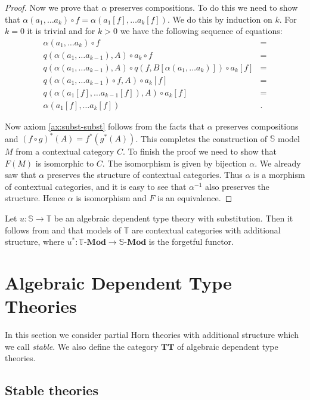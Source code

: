 \documentclass[reqno]{amsart}
\theoremstyle{definition}
\theoremstyle{remark}
\newcommand{\cat}[1]{\mathbf{#1}}
\newcommand{\algtt}{\cat{TT}}
\newcommand{\substTh}{\mathbb{S}}
\newcommand{\Mod}[1]{#1\text{-}\cat{Mod}}
\numberwithin{figure}{section}
\begin{document}
\begin{proof}
Now we prove that $\alpha$ preserves compositions.
To do this we need to show that $\alpha(a_1, \ldots a_k) \circ f = \alpha(a_1[f], \ldots a_k[f])$.
We do this by induction on $k$.
For $k = 0$ it is trivial and for $k > 0$ we have the following sequence of equations:
\begin{align*}
\alpha(a_1, \ldots a_k) \circ f & = \\
q(\alpha(a_1, \ldots a_{k-1}), A) \circ a_k \circ f & = \\
q(\alpha(a_1, \ldots a_{k-1}), A) \circ q(f, B[\alpha(a_1, \ldots a_k)]) \circ a_k[f] & = \\
q(\alpha(a_1, \ldots a_{k-1}) \circ f, A) \circ a_k[f] & = \\
q(\alpha(a_1[f], \ldots a_{k-1}[f]), A) \circ a_k[f] & = \\
\alpha(a_1[f], \ldots a_k[f]) & .
\end{align*}

Now axiom \eqref{ax:subst-subst} follows from the facts that $\alpha$ preserves compositions and $(f \circ g)^*(A) = f^*(g^*(A))$.
This completes the construction of $\substTh$ model $M$ from a contextual category $C$.
To finish the proof we need to show that $F(M)$ is isomorphic to $C$.
The isomorphism is given by bijection $\alpha$.
We already saw that $\alpha$ preserves the structure of contextual categories.
Thus $\alpha$ is a morphism of contextual categories, and it is easy to see that $\alpha^{-1}$ also preserves the structure.
Hence $\alpha$ is isomorphism and $F$ is an equivalence.
\end{proof}

Let $u : \substTh \to \mathbb{T}$ be an algebraic dependent type theory with substitution.
Then it follows from  and  that models of $\mathbb{T}$ are contextual categories with additional structure,
    where $u^* : \Mod{\mathbb{T}} \to \Mod{\substTh}$ is the forgetful functor.

\section{Algebraic Dependent Type Theories}

In this section we consider partial Horn theories with additional structure which we call \emph{stable}.
We also define the category $\algtt$ of algebraic dependent type theories.

\subsection{Stable theories}
\end{document}
